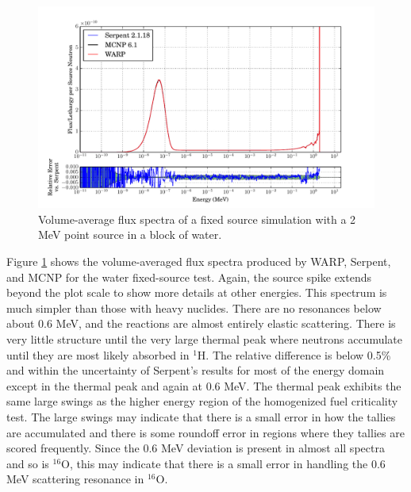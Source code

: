 \begin{figure}[h!]
\centering
\includegraphics[width=\textwidth,trim= 1cm 0cm 1cm 0cm]{graphics/finalresults/fixed_spec_water.pdf}
\caption{Volume-average flux spectra of a fixed source simulation with a 2 MeV point source in a block of water. \label{fixed_spec_water} }
\end{figure}

Figure \ref{fixed_spec_water} shows the volume-averaged flux spectra produced by WARP, Serpent, and MCNP for the water fixed-source test.%
Again, the source spike extends beyond the plot scale to show more details at other energies.  This spectrum is much simpler than those with heavy nuclides.  There are no resonances below about 0.6 MeV, and the reactions are almost entirely elastic scattering.  There is very little structure until the very large thermal peak where neutrons accumulate until they are most likely absorbed in $^1$H.  The relative difference is below 0.5\% and within the uncertainty of Serpent's results for most of the energy domain except in the thermal peak and again at 0.6 MeV.  The thermal peak exhibits the same large swings as the higher energy region of the homogenized fuel criticality test.  The large swings may indicate that there is a small error in how the tallies are accumulated and there is some roundoff error in regions where they tallies are scored frequently.   Since the 0.6 MeV deviation is present in almost all spectra and so is $^{16}$O, this may indicate that there is a small error in handling the 0.6 MeV scattering resonance in $^{16}$O.  


